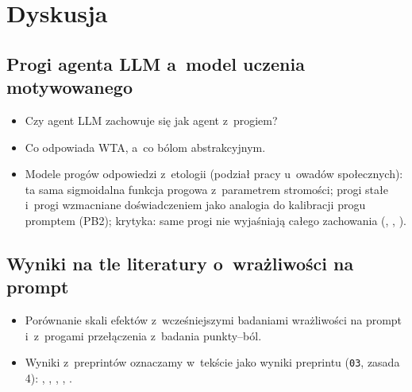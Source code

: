 
\chapter{Dyskusja}
\label{ch:dyskusja}


\section{Progi agenta LLM a~model uczenia motywowanego}
\label{sec:6-1}

\begin{planroboczy}[ok. 1,5 s.]
\begin{itemize}
  \item Czy agent LLM zachowuje się jak agent z~progiem?
  \item Co odpowiada WTA, a~co bólom abstrakcyjnym.
  \item Modele progów odpowiedzi z~etologii (podział pracy u~owadów społecznych): ta sama sigmoidalna funkcja progowa z~parametrem stromości; progi stałe i~progi wzmacniane doświadczeniem jako analogia do kalibracji progu promptem (PB2); krytyka: same progi nie wyjaśniają całego zachowania (\cite{bonabeau1996quantitative}, \cite{theraulaz1998response}, \cite{ulrich2021response}).
\end{itemize}

\end{planroboczy}

\section{Wyniki na tle literatury o~wrażliwości na prompt}
\label{sec:6-2}

\begin{planroboczy}[ok. 1 s.]
\begin{itemize}
  \item Porównanie skali efektów z~wcześniejszymi badaniami wrażliwości na prompt i~z~progami przełączenia z~badania punkty–ból.
  \item Wyniki z~preprintów oznaczamy w~tekście jako wyniki preprintu (\texttt{03}, zasada 4): \cite{keeling2024can}, \cite{masumori2025survival}, \cite{tagliabue2026pain}, \cite{schlatter2026incomplete}, \cite{mikaelson2025beyond}.
\end{itemize}

\end{planroboczy}

